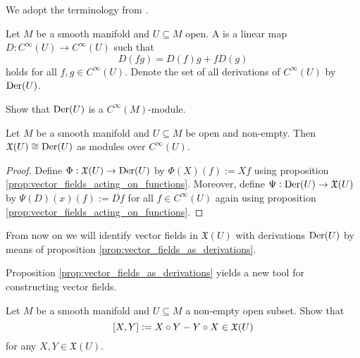 We adopt the terminology from \cite[218]{weibel:homological_algebra:1994}.

\begin{definition}[Derivation]
	Let $M$ be a smooth manifold and $U \subseteq M$ open. A  is a linear map $D : C^\infty(U) \to C^\infty(U)$ such that
	\begin{equation*}
		D(fg) = D(f)g + fD(g)
	\end{equation*}
	\noindent holds for all $f,g \in C^\infty(U)$. Denote the set of all derivations of $C^\infty(U)$ by $\operatorname{Der}(U)$.
\end{definition}

\begin{exercise}
	Show that $\operatorname{Der}(U)$ is a $C^\infty(M)$-module.
\end{exercise}

\begin{proposition}
	\label{prop:vector_fields_as_derivations}
	Let $M$ be a smooth manifold and $U \subseteq M$ be open and non-empty. Then $\mathfrak{X}(U) \cong \operatorname{Der}(U)$ as modules over $C^\infty(U)$.
\end{proposition}

\begin{proof}
	Define $\Phi : \mathfrak{X}(U) \to \operatorname{Der}(U)$ by $\Phi(X)(f) := Xf$ using proposition \ref{prop:vector_fields_acting_on_functions}. Moreover, define $\Psi : \operatorname{Der}(U) \to \mathfrak{X}(U)$ by $\Psi(D)(x)(f) := Df$ for all $f \in C^\infty(U)$ again using proposition \ref{prop:vector_fields_acting_on_functions}.
\end{proof}

\begin{remark}
	From now on we will identify vector fields in $\mathfrak{X}(U)$ with derivations $\operatorname{Der}(U)$ by means of proposition \ref{prop:vector_fields_as_derivations}. 
\end{remark}

Proposition \ref{prop:vector_fields_as_derivations} yields a new tool for constructing vector fields.

\begin{exercise}
	Let $M$ be a smooth manifold and $U \subseteq M$ a non-empty open subset. Show that 
	\begin{equation*}
		\sbr[0]{X,Y} := X\circ Y - Y\circ X \in \mathfrak{X}(U)
	\end{equation*}
	\noindent for any $X,Y \in \mathfrak{X}(U)$.
\end{exercise}

